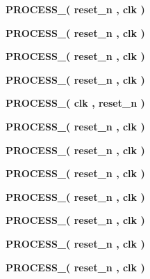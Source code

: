 \begin{DoxyCompactItemize}
\item 
{\bf P\+R\+O\+C\+E\+S\+S\+\_}{\bfseries  ( {\bfseries {\bfseries {\bf reset\+\_\+n}} \textcolor{vhdlchar}{ }} , {\bfseries {\bfseries {\bf clk}} \textcolor{vhdlchar}{ }} )}
\item 
{\bf P\+R\+O\+C\+E\+S\+S\+\_}{\bfseries  ( {\bfseries {\bfseries {\bf reset\+\_\+n}} \textcolor{vhdlchar}{ }} , {\bfseries {\bfseries {\bf clk}} \textcolor{vhdlchar}{ }} )}
\item 
{\bf P\+R\+O\+C\+E\+S\+S\+\_}{\bfseries  ( {\bfseries {\bfseries {\bf reset\+\_\+n}} \textcolor{vhdlchar}{ }} , {\bfseries {\bfseries {\bf clk}} \textcolor{vhdlchar}{ }} )}
\item 
{\bf P\+R\+O\+C\+E\+S\+S\+\_}{\bfseries  ( {\bfseries {\bfseries {\bf reset\+\_\+n}} \textcolor{vhdlchar}{ }} , {\bfseries {\bfseries {\bf clk}} \textcolor{vhdlchar}{ }} )}
\item 
{\bf P\+R\+O\+C\+E\+S\+S\+\_}{\bfseries  ( {\bfseries {\bfseries {\bf clk}} \textcolor{vhdlchar}{ }} , {\bfseries {\bfseries {\bf reset\+\_\+n}} \textcolor{vhdlchar}{ }} )}
\item 
{\bf P\+R\+O\+C\+E\+S\+S\+\_}{\bfseries  ( {\bfseries {\bfseries {\bf reset\+\_\+n}} \textcolor{vhdlchar}{ }} , {\bfseries {\bfseries {\bf clk}} \textcolor{vhdlchar}{ }} )}
\item 
{\bf P\+R\+O\+C\+E\+S\+S\+\_}{\bfseries  ( {\bfseries {\bfseries {\bf reset\+\_\+n}} \textcolor{vhdlchar}{ }} , {\bfseries {\bfseries {\bf clk}} \textcolor{vhdlchar}{ }} )}
\item 
{\bf P\+R\+O\+C\+E\+S\+S\+\_}{\bfseries  ( {\bfseries {\bfseries {\bf reset\+\_\+n}} \textcolor{vhdlchar}{ }} , {\bfseries {\bfseries {\bf clk}} \textcolor{vhdlchar}{ }} )}
\item 
{\bf P\+R\+O\+C\+E\+S\+S\+\_}{\bfseries  ( {\bfseries {\bfseries {\bf reset\+\_\+n}} \textcolor{vhdlchar}{ }} , {\bfseries {\bfseries {\bf clk}} \textcolor{vhdlchar}{ }} )}
\item 
{\bf P\+R\+O\+C\+E\+S\+S\+\_}{\bfseries  ( {\bfseries {\bfseries {\bf reset\+\_\+n}} \textcolor{vhdlchar}{ }} , {\bfseries {\bfseries {\bf clk}} \textcolor{vhdlchar}{ }} )}
\item 
{\bf P\+R\+O\+C\+E\+S\+S\+\_}{\bfseries  ( {\bfseries {\bfseries {\bf reset\+\_\+n}} \textcolor{vhdlchar}{ }} , {\bfseries {\bfseries {\bf clk}} \textcolor{vhdlchar}{ }} )}
\item 
{\bf P\+R\+O\+C\+E\+S\+S\+\_}{\bfseries  ( {\bfseries {\bfseries {\bf reset\+\_\+n}} \textcolor{vhdlchar}{ }} , {\bfseries {\bfseries {\bf clk}} \textcolor{vhdlchar}{ }} )}

\end{DoxyCompactItemize}
